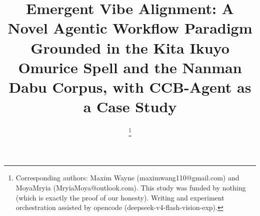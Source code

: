 \documentclass[conference,10pt]{IEEEtran}
\begin{document}
\title{Emergent Vibe Alignment: A Novel Agentic Workflow
Paradigm Grounded in the Kita Ikuyo Omurice Spell and
the Nanman Dabu Corpus, with CCB-Agent as a Case Study}

\author{
\and
{}
\thanks{Corresponding authors: Maxim Wayne (maximwang110@gmail.com) and MoyaMryia (MryiaMoya@outlook.com). This study was funded by nothing (which is exactly the proof of our honesty). Writing and experiment orchestration assisted by opencode (deepseek-v4-flash-vision-exp).}
}

\maketitle

\makeatletter
\renewcommand{\tablename}{Table}
\renewcommand{\figurename}{Fig.}
\renewcommand{\refname}{References}
\renewcommand{\abstractname}{Abstract}
\renewcommand{\proofname}{Proof}
\def\abstract{\normalfont
    \@IEEEabskeysecsize\bfseries\noindent\begin{center}\textbf{\abstractname}\end{center}\par\addvspace{0.4\baselineskip}%
    \@IEEEgobbleleadPARNLSP}
\def\endabstract{\relax\vspace{1.34ex}\par\normalfont\normalsize}
\makeatother
\end{document}
